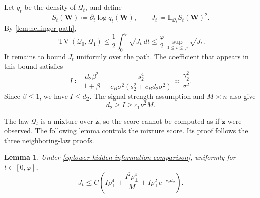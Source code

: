 \documentclass[11pt]{article}
\newtheorem{lemma}{Lemma}
\begin{document}
Let $q_t$ be the density of $\mathcal Q_t$, and define
\begin{equation}
  S_t(\bm W)\coloneqq\partial_t\log q_t(\bm W),
  \qquad
  J_t\coloneqq\mathbb E_{\mathcal Q_t}S_t(\bm W)^2.
\label{eq:lower-hidden-J-definition}
\end{equation}
By \cref{lem:hellinger-path},
\begin{equation}
  \operatorname{TV}(\mathcal Q_0,\mathcal Q_1)
  \le
  \frac12\int_0^\varphi\sqrt{J_t}\,dt
  \le
  \frac{\varphi}{2}
  \sup_{0\le t\le\varphi}\sqrt{J_t}.
\label{eq:lower-hidden-TV-by-J}
\end{equation}
It remains to bound $J_t$ uniformly over the path.  The coefficient that
appears in this bound satisfies
\begin{equation}
  I
  \coloneqq
  \frac{d_2\beta^2}{1+\beta}
  =
  \frac{s_2^4}{c_B\sigma^2(s_2^2+c_Bd_2\sigma^2)}
  \asymp
  \frac{\gamma_2^2}{\sigma^2}.
\label{eq:lower-hidden-I}
\end{equation}
Since $\beta\le1$, we have $I\le d_2$.  The signal-strength assumption and
$M\asymp n$ also give
\begin{equation}
  d_2\ge I\ge c_1\nu^2M.
\label{eq:lower-hidden-information-comparison}
\end{equation}

The law $\mathcal Q_t$ is a mixture over $\widetilde{\bm z}$, so the score
cannot be computed as if $\widetilde{\bm z}$ were observed.  The following
lemma controls the mixture score.  Its proof follows the three neighboring-law
proofs.

\begin{lemma}
\label{lem:lower-hidden-path-information}
Under \cref{eq:lower-hidden-information-comparison}, uniformly for
$t\in[0,\varphi]$,
\begin{equation}
  J_t
  \le
  C\left(
    I\rho_\perp^4
    +
    \frac{I^2\rho_\perp^4}{M}
    +
    I\rho_\perp^2e^{-c_2d_2}
  \right).
\label{eq:lower-hidden-J-bound}
\end{equation}
\end{lemma}
\end{document}
